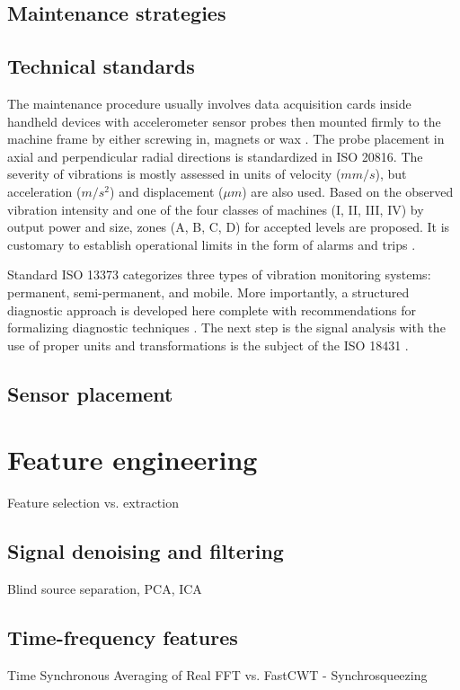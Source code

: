 	\subsection{Maintenance strategies}

	\subsection{Technical standards}
	The maintenance procedure usually involves data acquisition cards inside handheld devices with accelerometer sensor probes then mounted firmly to the machine frame by either screwing in, magnets or wax \cite{ziaran_technicka_2013}. The probe placement in axial and perpendicular radial directions is standardized in ISO 20816. The severity of vibrations is mostly assessed in units of velocity ($mm/s$), but acceleration ($m/s^2$) and displacement ($\mu m$) are also used. Based on the observed vibration intensity and one of the four classes of machines (I, II, III, IV) by output power and size, zones (A, B, C, D) for accepted levels are proposed. It is customary to establish operational limits in the form of alarms and trips \cite{iso_20816}. 

Standard ISO 13373 categorizes three types of vibration monitoring systems: permanent, semi-permanent, and mobile. More importantly, a structured diagnostic approach is developed here complete with recommendations for formalizing diagnostic techniques \cite{iso_13373}. The next step is the signal analysis with the use of proper units and transformations is the subject of the ISO 18431 \cite{iso_18431}. 
	
	\subsection{Sensor placement}

\section{Feature engineering}
	Feature selection vs. extraction
	
	\subsection{Signal denoising and filtering}
	Blind source separation, PCA, ICA
	
	\subsection{Time-frequency features}
	Time Synchronous Averaging of Real FFT
	vs. FastCWT - Synchrosqueezing
	
